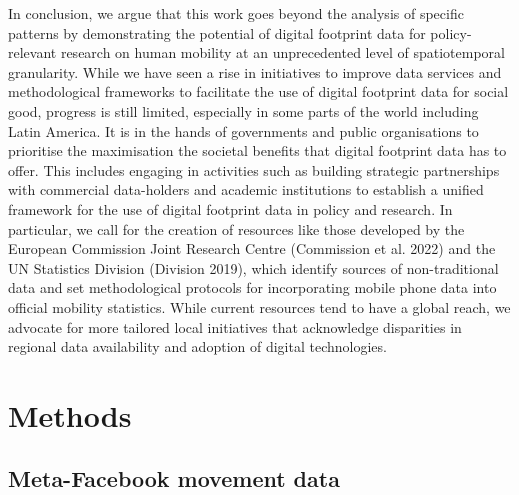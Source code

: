 \documentclass[
  11pt,
]{article}
\begin{document}
In conclusion, we argue that this work goes beyond the analysis of
specific patterns by demonstrating the potential of digital footprint
data for policy-relevant research on human mobility at an unprecedented
level of spatiotemporal granularity. While we have seen a rise in
initiatives to improve data services and methodological frameworks to
facilitate the use of digital footprint data for social good, progress
is still limited, especially in some parts of the world including Latin
America. It is in the hands of governments and public organisations to
prioritise the maximisation the societal benefits that digital footprint
data has to offer. This includes engaging in activities such as building
strategic partnerships with commercial data-holders and academic
institutions to establish a unified framework for the use of digital
footprint data in policy and research. In particular, we call for the
creation of resources like those developed by the European Commission
Joint Research Centre (Commission et al. 2022) and the UN Statistics
Division (Division 2019), which identify sources of non-traditional data
and set methodological protocols for incorporating mobile phone data
into official mobility statistics. While current resources tend to have
a global reach, we advocate for more tailored local initiatives that
acknowledge disparities in regional data availability and adoption of
digital technologies.

\hypertarget{sec-methods}{%
\section{Methods}\label{sec-methods}}

\hypertarget{meta-facebook-movement-data}{%
\subsection{Meta-Facebook movement
data}\label{meta-facebook-movement-data}}
\end{document}

